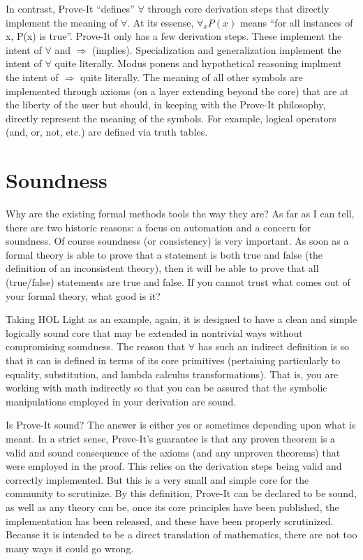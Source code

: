 \documentclass[12pt]{article}
\begin{document}
In contrast, Prove-It ``defines'' $\forall$ through core derivation steps that directly implement the meaning of $\forall$.  At its essense, $\forall_x P(x)$ means ``for all instances of x, P(x) is true''.  Prove-It only has a few derivation steps.  These implement the intent of $\forall$ and $\Rightarrow$ (implies).  Specialization and generalization implement the intent of $\forall$ quite literally.  Modus ponens and hypothetical reasoning implment the intent of $\Rightarrow$ quite literally.  The meaning of all other symbols are implemented through axioms (on a layer extending beyond the core) that are at the liberty of the user but should, in keeping with the Prove-It philosophy, directly represent the meaning of the symbols.  For example, logical operators (and, or, not, etc.) are defined via truth tables.

\section{Soundness}

Why are the existing formal methods tools the way they are?  As far as I can tell, there are two historic reasons: a focus on automation and a concern for soundness.  Of course soundness (or consistency) is very important.  As soon as a formal theory is able to prove that a statement is both true and false (the definition of an inconsistent theory), then it will be able to prove that all (true/false) statements are true and false.  If you cannot trust what comes out of your formal theory, what good is it?

Taking HOL Light as an example, again, it is designed to have a clean and simple logically sound core that may be extended in nontrivial ways without compromising soundness.  The reason that $\forall$ has such an indirect definition is so that it can is defined in terms of its core primitives (pertaining particularly to equality, substitution, and lambda calculus transformations).  That is, you are working with math indirectly so that you can be assured that the symbolic manipulations employed in your derivation are sound.

Is Prove-It sound?  The answer is either yes or sometimes depending upon what is meant.  In a strict sense, Prove-It's guarantee is that any proven theorem is a valid and sound consequence of the axioms (and any unproven theorems) that were employed in the proof.  This relies on the derivation steps being valid and correctly implemented.
But this is a very small and simple core for the community to scrutinize.  
By this definition, Prove-It can be declared to be sound, as well as any theory can be, once its core principles have been published, the implementation has been released, and these have been properly scrutinized.  Because it is intended to be a direct translation of mathematics, there are not too many ways it could go wrong.
\end{document}
